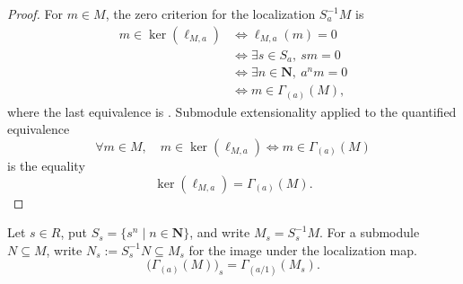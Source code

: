 \begin{proof}
  \leanok
  For $m\in M$, the zero criterion for the localization $S_a^{-1}M$ is
  \[
  \begin{aligned}
    m\in\ker(\ell_{M,a})
      &\Longleftrightarrow \ell_{M,a}(m)=0\\
      &\Longleftrightarrow \exists s\in S_a,\ sm=0\\
      &\Longleftrightarrow \exists n\in\mathbf N,\ a^nm=0\\
      &\Longleftrightarrow m\in\Gamma_{(a)}(M),
  \end{aligned}
  \]
  where the last equivalence is
  .  Submodule extensionality applied to
  the quantified equivalence
  \[
    \forall m\in M,\quad
    m\in\ker(\ell_{M,a})
      \Longleftrightarrow m\in\Gamma_{(a)}(M)
  \]
  is the equality
  \[
    \ker(\ell_{M,a})=\Gamma_{(a)}(M).
  \]
\end{proof}

\begin{lemma}
  \label{lemma:nagata-power-torsion-localization}
  \leanok

  Let $s\in R$, put $S_s=\{s^n\mid n\in\mathbf N\}$, and write
  $M_s=S_s^{-1}M$.  For a submodule $N\subseteq M$, write
  $N_s:=S_s^{-1}N\subseteq M_s$ for the image under the localization map.
  \[
    \bigl(\Gamma_{(a)}(M)\bigr)_s
      =\Gamma_{(a/1)}(M_s).
  \]
\end{lemma}


